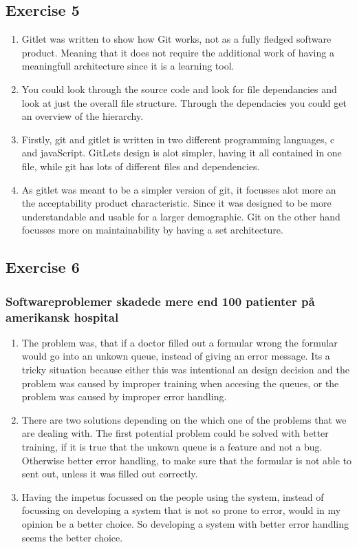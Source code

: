 \documentclass{article}
\begin{document}
\subsection*{Exercise 5}
\begin{enumerate}
    \item Gitlet was written to show how Git works, not as a fully fledged software product. Meaning that it does not require the additional work of having a meaningfull architecture since it is a learning tool.
    \item You could look through the source code and look for file dependancies and look at just the overall file structure. Through the dependacies you could get an overview of the hierarchy.
    \item Firstly, git and gitlet is written in two different programming languages, c and javaScript. GitLets design is alot simpler, having it all contained in one file, while git has lots of different files and dependencies.
    \item As gitlet was meant to be a simpler version of git, it focusses alot more an the acceptability product characteristic. Since it was designed to be more understandable and usable for a larger demographic. 
    Git on the other hand focusses more on maintainability by having a set architecture.
\end{enumerate}
\subsection*{Exercise 6}
\subsubsection*{Softwareproblemer skadede mere end 100 patienter på amerikansk hospital}
\begin{enumerate}
    \item The problem was, that if a doctor filled out a formular wrong the formular would go into an unkown queue, instead of giving an error message. Its a tricky situation because either this was intentional an design decision and the problem was caused by improper training when accesing the queues, or the problem was caused by improper error handling.
    \item There are two solutions depending on the which one of the problems that we are dealing with. The first potential problem could be solved with better training, if it is true that the unkown queue is a feature and not a bug. Otherwise better error handling, to make sure that the formular is not able to sent out, unless it was filled out correctly.
    \item Having the impetus focussed on the people using the system, instead of focussing on developing a system that is not so prone to error, would in my opinion be a better choice. So developing a system with better error handling seems the better choice. 

\end{enumerate}
\end{document}
